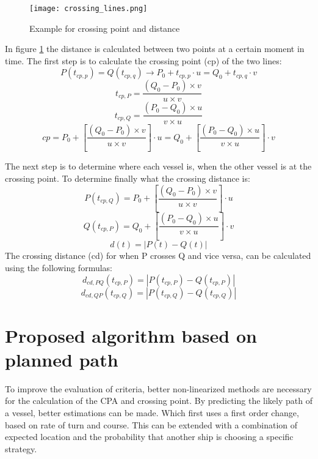\begin{figure}[h]
	\centering
	\texttt{[image: crossing\_lines.png]}
	\caption{Example for crossing point and distance}
	\label{fig:crossing-distance}
\end{figure}

In figure \ref{fig:crossing-distance} the distance is calculated between two points at a certain moment in time. The first step is to calculate the crossing point (cp) of the two lines:
\begin{equation}
	P(t_{cp,p}) = Q(t_{cp,q}) \rightarrow P_0 + t_{cp,p} \cdot u = Q_0 + t_{cp,q} \cdot v
\end{equation}
\begin{equation}
	t_{cp,P} = \frac{(Q_0 - P_0) \times v}{u \times v}
\end{equation}
\begin{equation}
	t_{cp,Q} = \frac{(P_0 - Q_0) \times u}{v \times u}
\end{equation}
\begin{equation}
	cp = P_0 + \left[ \frac{(Q_0 - P_0) \times v}{u \times v} \right] \cdot u =  Q_0 + \left[ \frac{(P_0 - Q_0) \times u}{v \times u} \right] \cdot v
\end{equation}

The next step is to determine where each vessel is, when the other vessel is at the crossing point. To determine finally what the crossing distance is:
\begin{equation}
	P(t_{cp,Q}) = P_0 + \left[ \frac{(Q_0 - P_0) \times v}{u \times v} \right] \cdot u
\end{equation}
\begin{equation}
	Q(t_{cp,P}) = Q_0 + \left[ \frac{(P_0 - Q_0) \times u}{v \times u} \right] \cdot v
\end{equation}
\begin{equation}
	d(t) = |P(t) - Q(t)|
\end{equation}
The crossing distance (cd) for when P crosses Q and vice versa, can be calculated using the following formulas:
\begin{equation}
	d_{cd,PQ}(t_{cp,P}) = |P(t_{cp,P}) - Q(t_{cp,P})|
\end{equation}
\begin{equation}
	d_{cd,QP}(t_{cp,Q}) = |P(t_{cp,Q}) - Q(t_{cp,Q})|
\end{equation}

\section{Proposed algorithm based on planned path}
To improve the evaluation of criteria, better non-linearized methods are necessary for the calculation of the \ac{CPA} and crossing point. By predicting the likely path of a vessel, better estimations can be made. Which first uses a first order change, based on rate of turn and course. This can be extended with a combination of expected location and the probability that another ship is choosing a specific strategy.

